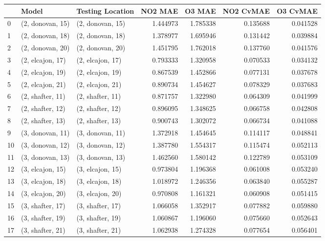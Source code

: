 \begin{tabular}{lllrrrr}
\toprule
{} &             Model &  Testing Location &   NO2 MAE &    O3 MAE &  NO2 CvMAE &  O3 CvMAE \\
\midrule
0  &  (2, donovan, 15) &  (2, donovan, 15) &  1.444973 &  1.785338 &   0.135688 &  0.041528 \\
1  &  (2, donovan, 18) &  (2, donovan, 18) &  1.378977 &  1.695946 &   0.131442 &  0.039884 \\
2  &  (2, donovan, 20) &  (2, donovan, 20) &  1.451795 &  1.762018 &   0.137760 &  0.041576 \\
3  &  (2, elcajon, 17) &  (2, elcajon, 17) &  0.793333 &  1.320958 &   0.070533 &  0.034132 \\
4  &  (2, elcajon, 19) &  (2, elcajon, 19) &  0.867539 &  1.452866 &   0.077131 &  0.037678 \\
5  &  (2, elcajon, 21) &  (2, elcajon, 21) &  0.890734 &  1.454627 &   0.078329 &  0.037683 \\
6  &  (2, shafter, 11) &  (2, shafter, 11) &  0.871757 &  1.322980 &   0.064309 &  0.041999 \\
7  &  (2, shafter, 12) &  (2, shafter, 12) &  0.896095 &  1.348625 &   0.066758 &  0.042808 \\
8  &  (2, shafter, 13) &  (2, shafter, 13) &  0.900743 &  1.302072 &   0.066734 &  0.041088 \\
9  &  (3, donovan, 11) &  (3, donovan, 11) &  1.372918 &  1.454645 &   0.114117 &  0.048841 \\
10 &  (3, donovan, 12) &  (3, donovan, 12) &  1.387780 &  1.554317 &   0.115474 &  0.052113 \\
11 &  (3, donovan, 13) &  (3, donovan, 13) &  1.462560 &  1.580142 &   0.122789 &  0.053109 \\
12 &  (3, elcajon, 15) &  (3, elcajon, 15) &  0.973804 &  1.196368 &   0.061008 &  0.053240 \\
13 &  (3, elcajon, 18) &  (3, elcajon, 18) &  1.018972 &  1.246356 &   0.063840 &  0.055287 \\
14 &  (3, elcajon, 20) &  (3, elcajon, 20) &  0.970808 &  1.161321 &   0.060908 &  0.051415 \\
15 &  (3, shafter, 17) &  (3, shafter, 17) &  1.066058 &  1.352917 &   0.077882 &  0.059880 \\
16 &  (3, shafter, 19) &  (3, shafter, 19) &  1.060867 &  1.196060 &   0.075660 &  0.052643 \\
17 &  (3, shafter, 21) &  (3, shafter, 21) &  1.062938 &  1.274328 &   0.077654 &  0.056401 \\

\end{tabular}
